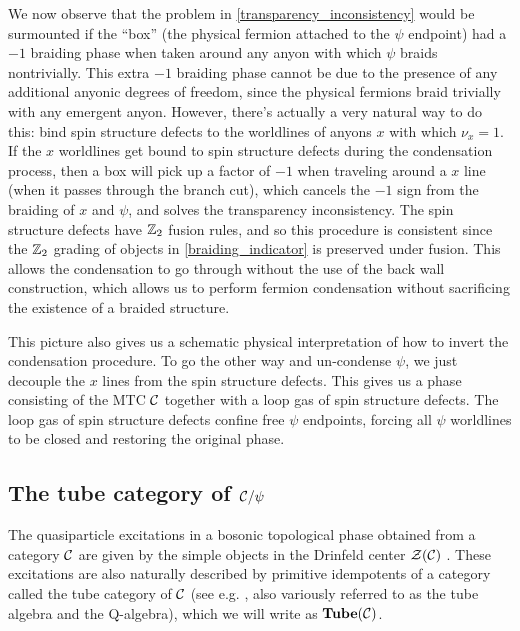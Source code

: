 We now observe that the problem in \eqref{transparency_inconsistency} would be 
surmounted if the ``box'' (the physical fermion attached to the $\psi$ endpoint) had a $-1$ 
braiding phase when taken around any anyon with which $\psi$ braids nontrivially. 
This extra $-1$ braiding phase cannot be due to the presence of any additional anyonic 
degrees of freedom, since the physical fermions braid trivially with any emergent anyon. 
However, there's actually a very natural way to do this: bind spin structure defects to the 
worldlines of anyons $x$ with which $\nu_x=1$. 
If the $x$ worldlines get bound to spin structure defects during the condensation 
process, then a box will pick up a factor of $-1$ when traveling around a $x$ line 
(when it passes through the branch cut), which cancels the $-1$ sign from the braiding of 
$x$ and $\psi$, and solves the transparency inconsistency. 
The spin structure defects have $\mathbb{Z}_2$ fusion rules, and so this procedure is consistent since 
the $\mathbb{Z}_2$ grading of objects in \eqref{braiding_indicator} is preserved under fusion. 
This allows the condensation to go through without the use of the back wall construction, 
which allows us to perform fermion condensation without sacrificing the existence of a 
braided structure. 

This picture also gives us a schematic physical interpretation of how to invert the condensation 
procedure. 
To go the other way and un-condense $\psi$, we just decouple the $x$ lines from the spin structure defects.
This gives us a phase consisting of the MTC $\mathcal{C}$ together with a loop gas of spin structure defects.
The loop gas of spin structure defects confine free $\psi$ endpoints, forcing all $\psi$ 
worldlines to be closed and restoring the original phase. 


\subsection{The tube category of $\mathcal{C}/\psi$}

The quasiparticle excitations in a bosonic topological phase obtained from a category $\mathcal{C}$ 
are given by the simple objects in the Drinfeld center $\mathcal{Z}(\mathcal{C})$ \cite{levin2005}.
These excitations are also naturally described by primitive idempotents of a category called the tube category of $\mathcal{C}$ (see e.g. \cite{ocneanu2001,evans1995,Izumi2000,muger2003b,Bultinck2017,Lan2014, Hu2015}, 
also variously referred to as the tube algebra and the Q-algebra), 
which we will write as $\textbf{Tube}(\mathcal{C})$.

